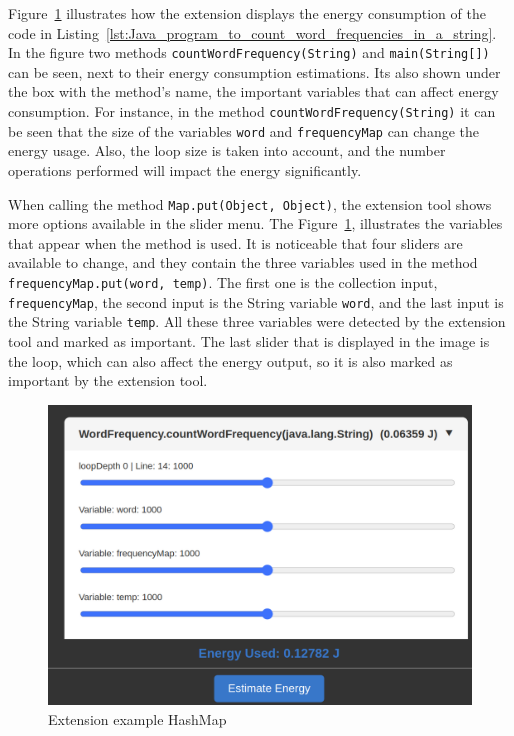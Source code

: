 Figure~\ref{fig:extension_example1} illustrates how the extension displays the energy consumption of the code in Listing~\ref{lst:Java_program_to_count_word_frequencies_in_a_string}. In the figure two methods \texttt{countWordFrequency(String)} and \texttt{main(String[])} can be seen, next to their energy consumption estimations. Its also shown under the box with the method's name, the important variables that can affect energy consumption. For instance, in the method \texttt{countWordFrequency(String)} it can be seen that the size of the variables \texttt{word} and \texttt{frequencyMap} can change the energy usage. Also, the loop size is taken into account, and the number operations performed will impact the energy significantly.

When calling the method \texttt{Map.put(Object, Object)}, the extension tool shows more options available in the slider menu. The Figure~\ref{fig:extension_example1}, illustrates the variables that appear when the method is used. It is noticeable that four sliders are available to change, and they contain the three variables used in the method \texttt{frequencyMap.put(word, temp)}. The first one is the collection input, \texttt{frequencyMap}, the second input is the String variable \texttt{word}, and the last input is the String variable \texttt{temp}. All these three variables were detected by the extension tool and marked as important. The last slider that is displayed in the image is the loop, which can also affect the energy output, so it is also marked as important by the extension tool.



\begin{figure}[htbp]
  \centering
  \includegraphics[width = .7 \textwidth]{figures/extension_example1.png}
  \caption{Extension example HashMap}
  \label{fig:extension_example1}
\end{figure}


